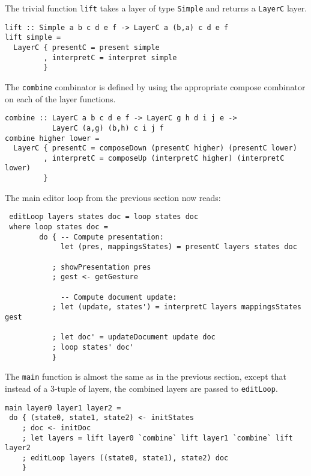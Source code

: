 The trivial function \texttt{lift} takes a layer of type \texttt{Simple} and returns a \texttt{LayerC} layer.

\begin{small}
\begin{verbatim}
lift :: Simple a b c d e f -> LayerC a (b,a) c d e f
lift simple = 
  LayerC { presentC = present simple
         , interpretC = interpret simple
         }
\end{verbatim}
\end{small}

The \texttt{combine} combinator is defined by using the appropriate compose combinator on each of the layer functions. 

\begin{small}
\begin{verbatim}
combine :: LayerC a b c d e f -> LayerC g h d i j e -> 
           LayerC (a,g) (b,h) c i j f
combine higher lower =
  LayerC { presentC = composeDown (presentC higher) (presentC lower)
         , interpretC = composeUp (interpretC higher) (interpretC lower)
         }
\end{verbatim}
\end{small}


 The main editor loop from the previous section now reads:
 
 \begin{small}
 \begin{verbatim}
 editLoop layers states doc = loop states doc
 where loop states doc = 
        do { -- Compute presentation:
             let (pres, mappingsStates) = presentC layers states doc
           
           ; showPresentation pres
           ; gest <- getGesture
 
             -- Compute document update:
           ; let (update, states') = interpretC layers mappingsStates gest
       
           ; let doc' = updateDocument update doc
           ; loop states' doc'
           }
\end{verbatim}
\end{small}

The \texttt{main} function is almost the same as in the previous section, except that instead of a 3-tuple of layers, the combined layers are passed to \texttt{editLoop}. 

\begin{small}
\begin{verbatim}
main layer0 layer1 layer2 = 
 do { (state0, state1, state2) <- initStates
    ; doc <- initDoc 
    ; let layers = lift layer0 `combine` lift layer1 `combine` lift  layer2
    ; editLoop layers ((state0, state1), state2) doc
    }
\end{verbatim}
\end{small}


